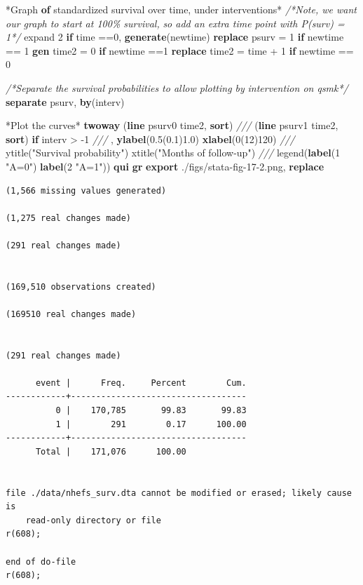 \documentclass[
  10pt,
]{book}
\newenvironment{Shaded}{\begin{snugshade}}{\end{snugshade}}
\newcommand{\BaseNTok}[1]{\textcolor[rgb]{0.00,0.00,0.81}{#1}}
\newcommand{\CommentTok}[1]{\textcolor[rgb]{0.56,0.35,0.01}{\textit{#1}}}
\newcommand{\KeywordTok}[1]{\textcolor[rgb]{0.13,0.29,0.53}{\textbf{#1}}}
\newcommand{\NormalTok}[1]{#1}
\newcommand{\StringTok}[1]{\textcolor[rgb]{0.31,0.60,0.02}{#1}}
\begin{document}
\begin{Shaded}
\begin{Highlighting}[]
\NormalTok{*Graph }\KeywordTok{of}\NormalTok{ standardized survival }\BaseNTok{over}\NormalTok{ time, under interventions*}
\CommentTok{/*Note, we want our graph to start at 100\% survival, }
\CommentTok{so add an extra time point with P(surv) = 1*/}
\NormalTok{expand 2 }\KeywordTok{if}\NormalTok{ time ==0, }\KeywordTok{generate}\NormalTok{(newtime)}
\KeywordTok{replace}\NormalTok{ psurv  = 1 }\KeywordTok{if}\NormalTok{ newtime == 1}
\KeywordTok{gen}\NormalTok{ time2 = 0 }\KeywordTok{if}\NormalTok{ newtime ==1}
\KeywordTok{replace}\NormalTok{ time2 = time + 1 }\KeywordTok{if}\NormalTok{ newtime == 0}

\CommentTok{/*Separate the survival probabilities to allow plotting by }
\CommentTok{intervention on qsmk*/}
\KeywordTok{separate}\NormalTok{ psurv, }\KeywordTok{by}\NormalTok{(interv)}

\NormalTok{*Plot the curves*}
\KeywordTok{twoway}\NormalTok{ (}\KeywordTok{line}\NormalTok{ psurv0 time2, }\KeywordTok{sort}\NormalTok{) }\CommentTok{///}
\NormalTok{  (}\KeywordTok{line}\NormalTok{ psurv1 time2, }\KeywordTok{sort}\NormalTok{) }\KeywordTok{if}\NormalTok{ interv \textgreater{} {-}1 }\CommentTok{///}
\NormalTok{  , }\KeywordTok{ylabel}\NormalTok{(0.5(0.1)1.0) }\KeywordTok{xlabel}\NormalTok{(0(12)120) }\CommentTok{///}
  \BaseNTok{ytitle}\NormalTok{(}\StringTok{"Survival probability"}\NormalTok{) }\BaseNTok{xtitle}\NormalTok{(}\StringTok{"Months of follow{-}up"}\NormalTok{) }\CommentTok{///}
  \BaseNTok{legend}\NormalTok{(}\KeywordTok{label}\NormalTok{(1 }\StringTok{"A=0"}\NormalTok{) }\KeywordTok{label}\NormalTok{(2 }\StringTok{"A=1"}\NormalTok{))}
\KeywordTok{qui} \KeywordTok{gr} \KeywordTok{export}\NormalTok{ ./figs/stata{-}fig{-}17{-}2.png, }\KeywordTok{replace}
\end{Highlighting}
\end{Shaded}

\begin{verbatim}
(1,566 missing values generated)

(1,275 real changes made)

(291 real changes made)


(169,510 observations created)

(169510 real changes made)


(291 real changes made)

      event |      Freq.     Percent        Cum.
------------+-----------------------------------
          0 |    170,785       99.83       99.83
          1 |        291        0.17      100.00
------------+-----------------------------------
      Total |    171,076      100.00


file ./data/nhefs_surv.dta cannot be modified or erased; likely cause is
    read-only directory or file
r(608);

end of do-file
r(608);
\end{verbatim}
\end{document}
